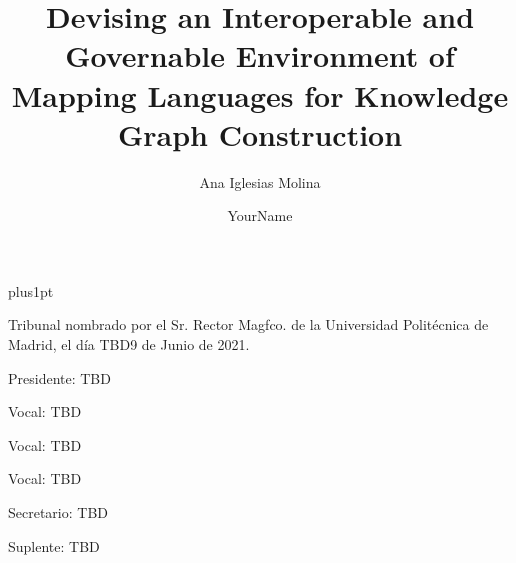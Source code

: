 \documentclass[twoside,11pt,table,xcdraw]{Latex/Classes/PhDthesisPSnPDF}
\title{Devising an Interoperable and Governable Environment of Mapping Languages for Knowledge Graph Construction}
\author{{\hspace{7mm} Ana Iglesias Molina}}
\author{YourName}
\begin{document}

\renewcommand\baselinestretch{1.2}
\baselineskip=18pt plus1pt




\newcommand{\attention}[1]{{\color{red}\textbf{#1}}}

\renewcommand\appendixname{ANNEX}


\frontmatter
\maketitle  %




\pagestyle{plain}
\cleardoublepage
\pagestyle{plain}


\noindent Tribunal nombrado por el Sr. Rector Magfco. de la Universidad Polit\'{e}cnica de
Madrid, el d\'{i}a TBD9 de Junio de 2021. %

\vspace{10mm}
Presidente:\hspace{0.3mm} TBD%

\vspace{5mm}
Vocal: \hspace{6.7mm} TBD%

\vspace{5mm}
Vocal: \hspace{6.7mm} TBD%

\vspace{5mm}
Vocal: \hspace{6.7mm} TBD%


\vspace{5mm}
Secretario:\hspace{0.67mm} TBD%

\vspace{5mm}
Suplente: \hspace{1.5mm} TBD%
\end{document}
